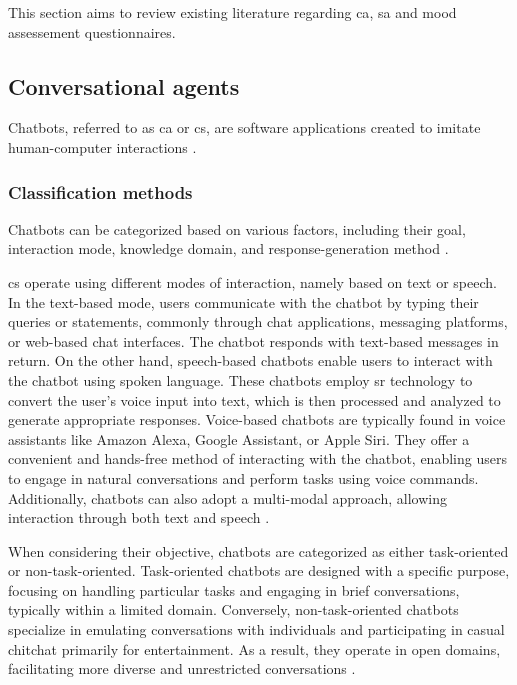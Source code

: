 \documentclass[a4paper,fleqn]{cas-dc}
\begin{document}
This section aims to review existing literature regarding \gls{ca}, \gls{sa} and mood assessement questionnaires.

\subsection{Conversational agents}
\label{conversationalAgents}

Chatbots, referred to as \gls{ca} or \gls{cs}, are software applications created to imitate human-computer interactions  \cite{montenegro_survey_2019}.

\subsubsection{Classification methods}

Chatbots can be categorized based on various factors, including their goal, interaction mode, knowledge domain, and response-generation method \cite{hussain_survey_2019}.

\gls{cs} operate using different modes of interaction, namely based on text or speech. In the text-based mode, users communicate with the chatbot by typing their queries or statements, commonly through chat applications, messaging platforms, or web-based chat interfaces. The chatbot responds with text-based messages in return. On the other hand, speech-based chatbots enable users to interact with the chatbot using spoken language. These chatbots employ \gls{sr} technology to convert the user's voice input into text, which is then processed and analyzed to generate appropriate responses. Voice-based chatbots are typically found in voice assistants like Amazon Alexa, Google Assistant, or Apple Siri. They offer a convenient and hands-free method of interacting with the chatbot, enabling users to engage in natural conversations and perform tasks using voice commands. Additionally, chatbots can also adopt a multi-modal approach, allowing interaction through both text and speech \cite{montenegro_survey_2019}.

When considering their objective, chatbots are categorized as either task-oriented or non-task-oriented. Task-oriented chatbots are designed with a specific purpose, focusing on handling particular tasks and engaging in brief conversations, typically within a limited domain. Conversely, non-task-oriented chatbots specialize in emulating conversations with individuals and participating in casual chitchat primarily for entertainment. As a result, they operate in open domains, facilitating more diverse and unrestricted conversations \cite{hussain_survey_2019}.
\end{document}
